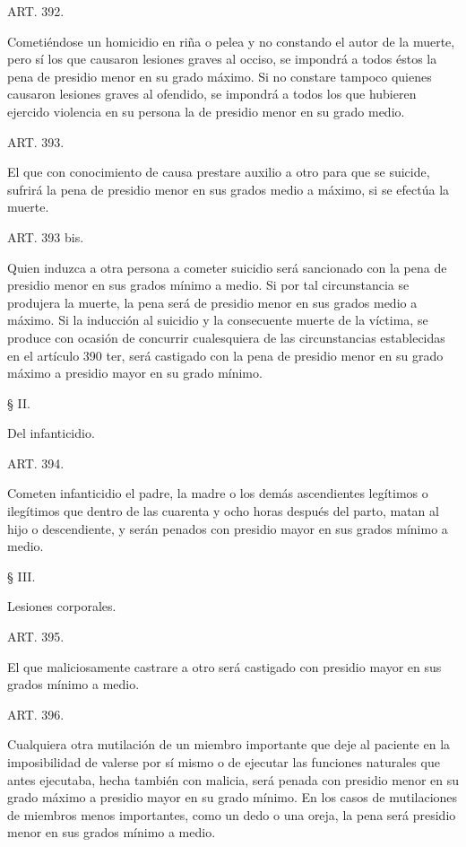     ART. 392.

    Cometiéndose un homicidio en riña o pelea y no constando el autor de la muerte, pero sí los que causaron lesiones graves al occiso, se impondrá a todos éstos la pena de presidio menor en su grado máximo.
    Si no constare tampoco quienes causaron lesiones graves al ofendido, se impondrá a todos los que hubieren ejercido violencia en su persona la de presidio menor en su grado medio.



    ART. 393.

    El que con conocimiento de causa prestare auxilio a otro para que se suicide, sufrirá la pena de presidio menor en sus grados medio a máximo, si se efectúa la muerte.


    ART. 393 bis.

    Quien induzca a otra persona a cometer suicidio será sancionado con la pena de presidio menor en sus grados mínimo a medio. Si por tal circunstancia se produjera la muerte, la pena será de presidio menor en sus grados medio a máximo.
    Si la inducción al suicidio y la consecuente muerte de la víctima, se produce con ocasión de concurrir cualesquiera de las circunstancias establecidas en el artículo 390 ter, será castigado con la pena de presidio menor en su grado máximo a presidio mayor en su grado mínimo.



    § II.

    Del infanticidio.


    ART. 394.

    Cometen infanticidio el padre, la madre o los demás ascendientes legítimos o ilegítimos que dentro de las cuarenta y ocho horas después del parto, matan al hijo o descendiente, y serán penados con presidio mayor en sus grados mínimo a medio.


    § III.

    Lesiones corporales.


    ART. 395.

    El que maliciosamente castrare a otro será castigado con presidio mayor en sus grados mínimo a medio.



    ART. 396.

    Cualquiera otra mutilación de un miembro importante que deje al paciente en la imposibilidad de valerse por sí mismo o de ejecutar las funciones naturales que antes ejecutaba, hecha también con malicia, será penada con presidio menor en su grado máximo a presidio mayor en su grado mínimo.
    En los casos de mutilaciones de miembros menos importantes, como un dedo o una oreja, la pena será presidio menor en sus grados mínimo a medio.


